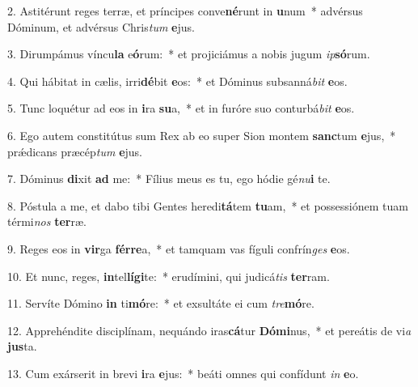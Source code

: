 2. Astitérunt reges terræ, et príncipes conve\textbf{né}runt in \textbf{u}num~*  advérsus Dóminum, et advérsus Chris\textit{tum} \textbf{e}jus.\

3. Dirumpámus víncu\textbf{la} e\textbf{ó}rum:~*  et projiciámus a nobis jugum \textit{ip}\textbf{só}rum.\

4. Qui hábitat in cælis, irri\textbf{dé}bit \textbf{e}os:~*  et Dóminus subsanná\textit{bit} \textbf{e}os.\

5. Tunc loquétur ad eos in \textbf{i}ra \textbf{su}a,~*  et in furóre suo conturbá\textit{bit} \textbf{e}os.\

6. Ego autem constitútus sum Rex ab eo super Sion montem \textbf{sanc}tum \textbf{e}jus,~*  prǽdicans præcép\textit{tum} \textbf{e}jus.\

7. Dóminus \textbf{di}xit \textbf{ad} me:~*  Fílius meus es tu, ego hódie gé\textit{nu}\textbf{i} te.\

8. Póstula a me, et dabo tibi Gentes heredi\textbf{tá}tem \textbf{tu}am,~*  et possessiónem tuam térmi\textit{nos} \textbf{ter}ræ.\

9. Reges eos in \textbf{vir}ga \textbf{fér}\textbf{re}a,~*  et tamquam vas fíguli confrín\textit{ges} \textbf{e}os.\

10. Et nunc, reges, \textbf{in}tel\textbf{lí}\textbf{gi}te:~*  erudímini, qui judicá\textit{tis} \textbf{ter}ram.\

11. Servíte Dómino \textbf{in} ti\textbf{mó}re:~*  et exsultáte ei cum \textit{tre}\textbf{mó}re.\

12. Apprehéndite disciplínam, nequándo iras\textbf{cá}tur \textbf{Dó}\textbf{mi}nus,~*  et pereátis de vi\textit{a} \textbf{jus}ta.\

13. Cum exárserit in brevi \textbf{i}ra \textbf{e}jus:~*  beáti omnes qui confídunt \textit{in} \textbf{e}o.\

